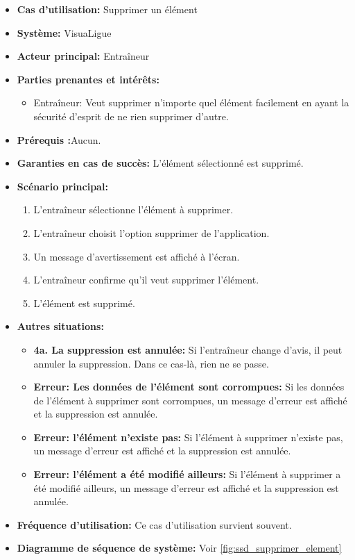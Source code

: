 \begin{itemize}
    \item \textbf{Cas d'utilisation:} Supprimer un \'el\'ement
    \item \textbf{Syst\`eme:} VisuaLigue
    \item \textbf{Acteur principal:} Entra\^ineur
    \item \textbf{Parties prenantes et int\'er\^ets:}
        \begin{itemize}
            \item Entraîneur: Veut supprimer n'importe quel élément facilement en ayant la sécurité d'esprit de ne rien supprimer d'autre.
        \end{itemize}
    \item \textbf{Pr\'erequis :}Aucun.
    \item \textbf{Garanties en cas de succ\`es:} L'élément sélectionné est supprimé.
    \item \textbf{Sc\'enario principal:}
        \begin{enumerate}
            \item L'entraîneur sélectionne l'élément à supprimer.
            \item L'entraîneur choisit l'option supprimer de l'application.
            \item Un message d'avertissement est affiché à l'écran.
            \item L'entraîneur confirme qu'il veut supprimer l'\'el\'ement.
            \item L'\'el\'ement est supprim\'e.
        \end{enumerate}
    \item \textbf{Autres situations:}
        \begin{itemize}
            \item \textbf{4a. La suppression est annul\'ee:} Si l'entraîneur change d'avis, il peut annuler la suppression. Dans ce cas-l\`a, rien ne se passe.
            \item \textbf{Erreur: Les donn\'ees de l'\'el\'ement sont corrompues:} Si les donn\'ees de l'\'el\'ement \`a supprimer sont corrompues, un message d'erreur est affich\'e et la suppression est annul\'ee.
            \item \textbf{Erreur: l'\'el\'ement n'existe pas:} Si l'\'el\'ement \`a supprimer n'existe pas, un message d'erreur est affich\'e et la suppression est annul\'ee.
            \item \textbf{Erreur: l'\'el\'ement a \'et\'e modifi\'e ailleurs:} Si l'\'el\'ement \`a supprimer a \'et\'e modifi\'e ailleurs, un message d'erreur est affich\'e et la suppression est annul\'ee.
        \end{itemize}
    \item \textbf{Fréquence d'utilisation:} Ce cas d'utilisation survient souvent.
    \item \textbf{Diagramme de s\'equence de syst\`eme:} Voir \ref{fig:ssd_supprimer_element}
\end{itemize}

